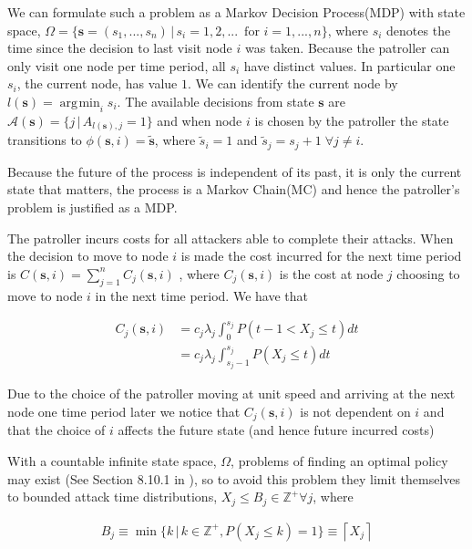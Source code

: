 \documentclass[a4paper,10pt]{article}
\newcommand{\ceil}[1]{\left \lceil #1 \right \rceil}
\DeclareMathOperator*{\argmin}{\arg\!\min}
\theoremstyle{definition}
\theoremstyle{definition}
\theoremstyle{remark}
\theoremstyle{definition}
\begin{document}
We can formulate such a problem as a Markov Decision Process(MDP) with state space, $\Omega= \{\bm{s}=(s_{1},...,s_{n}) \, | \, s_{i}=1,2,... \, \text{ for } i=1,...,n \}$,  where $s_{i}$ denotes the time since the decision to last visit node $i$ was taken. Because the patroller can only visit one node per time period, all $s_{i}$ have distinct values. In particular one $s_{i}$, the current node, has value $1$. We can identify the current node by $l(\bm{s})=\argmin_{i} s_{i}$. The available decisions from state $\bm{s}$ are $\mathcal{A}(\bm{s})=\{j \, | \, A_{l(\bm{s}),j}=1 \}$ and when node $i$ is chosen by the patroller the state transitions to $\phi(\bm{s},i)=\widetilde{\bm{s}}$, where $\widetilde{s}_{i}=1$ and $\widetilde{s}_{j}=s_{j}+1 \; \forall j \neq i$.

Because the future of the process is independent of its past, it is only the current state that matters, the process is a Markov Chain(MC) and hence the patroller's problem is justified as a MDP.

The patroller incurs costs for all attackers able to complete their attacks. When the decision to move to node $i$ is made the cost incurred for the next time period is $C(\bm{s},i)=\sum\limits_{j=1}^{n} C_{j}(\bm{s},i)$ , where $C_{j}(\bm{s},i)$ is the cost at node $j$ choosing to move to node $i$ in the next time period. We have that

\begin{align*}
C_{j}(\bm{s},i)&=c_{j} \lambda_{j} \int_{0}^{s_{j}} P(t-1 < X_{j} \leq t) dt \\
&=c_{j} \lambda_{j} \int_{s_{j}-1}^{s_{j}} P(X_{j} \leq t) dt
\end{align*}

Due to the choice of the patroller moving at unit speed and arriving at the next node one time period later we notice that $C_{j}(\bm{s},i)$ is not dependent on $i$ and that the choice of $i$ affects the future state (and hence future incurred costs)
  
With a countable infinite state space, $\Omega$, problems of finding an optimal policy may exist (See Section 8.10.1 in \cite{Puterman1994}), so to avoid this problem they limit themselves to bounded attack time distributions, $X_{j} \leq B_{j} \in \mathbb{Z}^{+} \forall j $, where

\begin{align}
\label{Equation:Definition of attack time bound}
B_{j} \equiv \min \{ k \, | \, k \in \mathbb{Z}^{+} , P(X_{j} \leq k)=1 \} \equiv \ceil{X_{j}}
\end{align}
\end{document}
